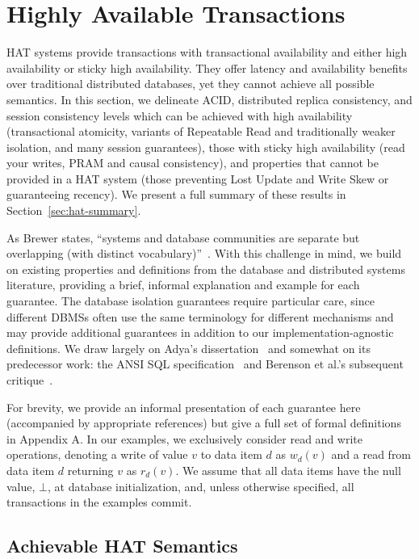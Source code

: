 
\section{Highly Available Transactions}
\label{sec:hats}

HAT systems provide transactions with transactional availability and
either high availability or sticky high availability. They offer
latency and availability benefits over traditional distributed
databases, yet they cannot achieve all possible semantics. In this
section, we delineate ACID, distributed replica consistency, and
session consistency levels which can be achieved with high
availability (transactional atomicity, variants of Repeatable Read and
traditionally weaker isolation, and many session guarantees), those
with sticky high availability (read your writes, PRAM and causal
consistency), and properties that cannot be provided in a HAT system
(those preventing Lost Update and Write Skew or guaranteeing recency).
We present a full summary of these results in
Section~\ref{sec:hat-summary}.

As Brewer states, ``systems and database communities are separate but
overlapping (with distinct vocabulary)''~\cite{brewer-slides}. With
this challenge in mind, we build on existing properties and
definitions from the database and distributed systems literature,
providing a brief, informal explanation and example for each
guarantee. The database isolation guarantees require particular care,
since different DBMSs often use the same terminology for different
mechanisms and may provide additional guarantees in addition to our
implementation-agnostic definitions.  We draw largely on Adya's
dissertation~\cite{adya} and somewhat on its predecessor work: the
ANSI SQL specification~\cite{ansi-sql} and Berenson et al.'s
subsequent critique~\cite{ansicritique}.

For brevity, we provide an informal presentation of each guarantee
here (accompanied by appropriate references) but give a full set of
formal definitions in
 Appendix A.
In our examples, we exclusively consider read and write operations,
denoting a write of value $v$ to data item $d$ as $w_d(v)$ and a read
from data item $d$ returning $v$ as $r_d(v)$. We assume that all data
items have the null value, $\bot$, at database initialization, and,
unless otherwise specified, all transactions in the examples commit.

\subsection{Achievable HAT Semantics}

